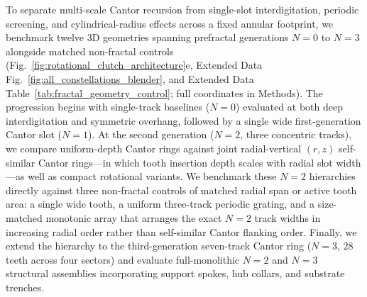 \documentclass[pdflatex,sn-nature]{sn-jnl}
\begin{document}
To separate multi-scale Cantor recursion from single-slot interdigitation, periodic screening, and cylindrical-radius effects across a fixed annular footprint, we benchmark twelve 3D geometries spanning prefractal generations $N=0$ to $N=3$ alongside matched non-fractal controls (Fig.~\ref{fig:rotational_clutch_architecture}e, Extended Data Fig.~\ref{fig:all_constellations_blender}, and Extended Data Table~\ref{tab:fractal_geometry_control}; full coordinates in Methods). The progression begins with single-track baselines ($N=0$) evaluated at both deep interdigitation and symmetric overhang, followed by a single wide first-generation Cantor slot ($N=1$). At the second generation ($N=2$, three concentric tracks), we compare uniform-depth Cantor rings against joint radial-vertical $(r,z)$ self-similar Cantor rings---in which tooth insertion depth scales with radial slot width---as well as compact rotational variants. We benchmark these $N=2$ hierarchies directly against three non-fractal controls of matched radial span or active tooth area: a single wide tooth, a uniform three-track periodic grating, and a size-matched monotonic array that arranges the exact $N=2$ track widths in increasing radial order rather than self-similar Cantor flanking order. Finally, we extend the hierarchy to the third-generation seven-track Cantor ring ($N=3$, $28$ teeth across four sectors) and evaluate full-monolithic $N=2$ and $N=3$ structural assemblies incorporating support spokes, hub collars, and substrate trenches.
\end{document}
